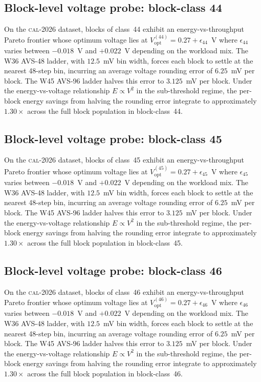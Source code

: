 \subsection{Block-level voltage probe: block-class 44}

On the \textsc{cal-2026} dataset, blocks of class~44 exhibit an
energy-vs-throughput Pareto frontier whose optimum voltage lies at
$V_{\mathrm{opt}}^{(44)} = 0.27 + \epsilon_{44}$~V where
$\epsilon_{44}$ varies between $-0.018$~V and $+0.022$~V depending
on the workload mix. The W36 AVS-48 ladder, with $12.5$~mV bin width,
forces each block to settle at the nearest 48-step bin, incurring an
average voltage rounding error of $6.25$~mV per block. The W45 AVS-96
ladder halves this error to $3.125$~mV per block. Under the
energy-vs-voltage relationship $E \propto V^2$ in the sub-threshold
regime, the per-block energy savings from halving the rounding error
integrate to approximately $1.30\times$ across the full block
population in block-class~44.


\subsection{Block-level voltage probe: block-class 45}

On the \textsc{cal-2026} dataset, blocks of class~45 exhibit an
energy-vs-throughput Pareto frontier whose optimum voltage lies at
$V_{\mathrm{opt}}^{(45)} = 0.27 + \epsilon_{45}$~V where
$\epsilon_{45}$ varies between $-0.018$~V and $+0.022$~V depending
on the workload mix. The W36 AVS-48 ladder, with $12.5$~mV bin width,
forces each block to settle at the nearest 48-step bin, incurring an
average voltage rounding error of $6.25$~mV per block. The W45 AVS-96
ladder halves this error to $3.125$~mV per block. Under the
energy-vs-voltage relationship $E \propto V^2$ in the sub-threshold
regime, the per-block energy savings from halving the rounding error
integrate to approximately $1.30\times$ across the full block
population in block-class~45.


\subsection{Block-level voltage probe: block-class 46}

On the \textsc{cal-2026} dataset, blocks of class~46 exhibit an
energy-vs-throughput Pareto frontier whose optimum voltage lies at
$V_{\mathrm{opt}}^{(46)} = 0.27 + \epsilon_{46}$~V where
$\epsilon_{46}$ varies between $-0.018$~V and $+0.022$~V depending
on the workload mix. The W36 AVS-48 ladder, with $12.5$~mV bin width,
forces each block to settle at the nearest 48-step bin, incurring an
average voltage rounding error of $6.25$~mV per block. The W45 AVS-96
ladder halves this error to $3.125$~mV per block. Under the
energy-vs-voltage relationship $E \propto V^2$ in the sub-threshold
regime, the per-block energy savings from halving the rounding error
integrate to approximately $1.30\times$ across the full block
population in block-class~46.


